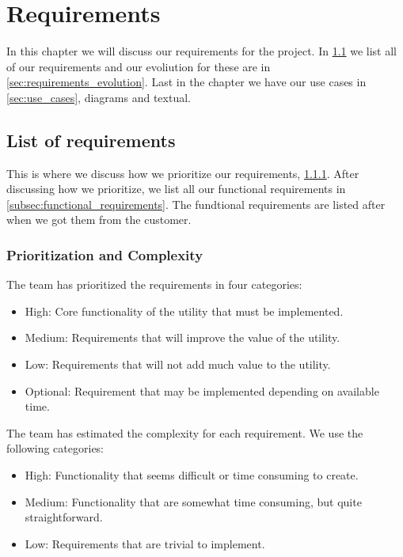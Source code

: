 \documentclass{report}
\begin{document}
\chapter{Requirements} \label{cha:requirements}
In this chapter we will discuss our requirements for the project. In \ref{sec:list_of_requirements} we list all of our requirements and our evoliution for these are in \ref{sec:requirements_evolution}. Last in the chapter we have our use cases in \ref{sec:use_cases}, diagrams and textual.
\newpage
\section{List of requirements} \label{sec:list_of_requirements}
This is where we discuss how we prioritize our requirements, \ref{subsec:prioritization_and_complexity}. After discussing how we prioritize, we list all our functional requirements in \ref{subsec:functional_requirements}. The fundtional requirements are listed after when we got them from the customer.
\subsection{Prioritization and Complexity} \label{subsec:prioritization_and_complexity}
The team has prioritized the requirements in four categories:
\begin{itemize}
    \item High: Core functionality of the utility that must be implemented.
    \item Medium: Requirements that will improve the value of the utility.
    \item Low: Requirements that will not add much value to the utility.
    \item Optional: Requirement that may be implemented depending on available time.
\end{itemize}
The team has estimated the complexity for each requirement. We use the following categories:
\begin{itemize}
    \item High: Functionality that seems difficult or time consuming to create.
    \item Medium: Functionality that are somewhat time consuming, but quite straightforward.
    \item Low: Requirements that are trivial to implement.
\end{itemize}   
\end{document}
